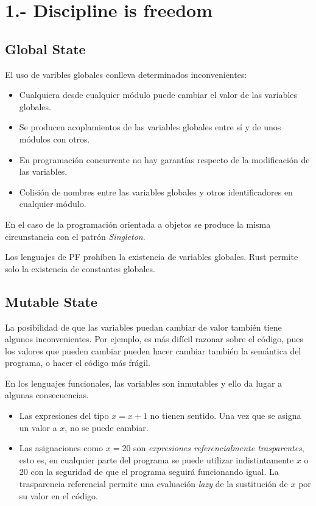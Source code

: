 \documentclass[a4paper,11pt]{extarticle}
\begin{document}
\section{1.- Discipline is freedom}
\subsection{Global State}
El uso de varibles globales conlleva determinados inconvenientes:
\begin{itemize}
	\item Cualquiera desde cualquier módulo puede cambiar el valor de las variables globales.
	\item Se producen acoplamientos de las variables globales entre sí y de unos módulos con otros.
	\item En programación concurrente no hay garantías respecto de la modificación de las variables.
	\item Colisión de nombres entre las variables globales y otros identificadores en cualquier módulo.
\end{itemize}

En el caso de la programación orientada a objetos se produce la misma circunstancia con el patrón \textit{Singleton}.

Los lenguajes de PF prohíben la existencia de variables globales. Rust permite solo la existencia de constantes globales.

\subsection{Mutable State}
La posibilidad de que las variables puedan cambiar de valor también tiene algunos inconvenientes. Por ejemplo, es más difícil razonar sobre el código, pues los valores que pueden cambiar pueden hacer cambiar también la semántica del programa, o hacer el código más frágil.

En los lenguajes funcionales, las variables son inmutables y ello da lugar a algunas consecuencias.
\begin{itemize}
	\item Las expresiones del tipo $x = x +1$ no tienen sentido. Una vez que se asigna un valor a $x$, no se puede cambiar.
	\item Las asignaciones como $x=20$ son \textit{expresiones referencialmente trasparentes}, esto es, en cualquier parte del programa se puede utilizar indistintamente $x$ o $20$ con la seguridad de que el programa seguirá funcionando igual. La trasparencia referencial permite una evaluación \textit{lazy} de la sustitución de $x$ por su valor en el código.
\end{itemize}
\end{document}
